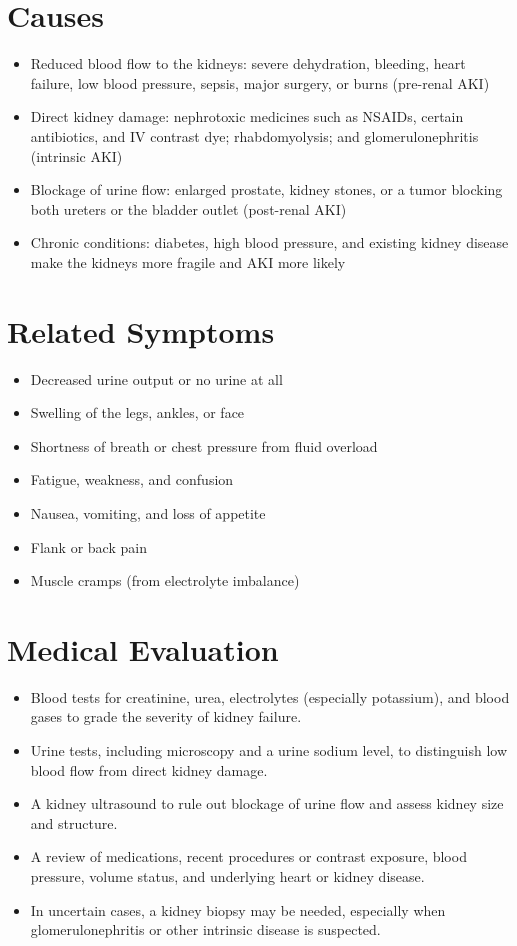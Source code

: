 \section*{Causes}
\begin{itemize}
  \item Reduced blood flow to the kidneys: severe dehydration, bleeding, heart failure, low blood pressure, sepsis, major surgery, or burns (pre-renal AKI)
  \item Direct kidney damage: nephrotoxic medicines such as NSAIDs, certain antibiotics, and IV contrast dye; rhabdomyolysis; and glomerulonephritis (intrinsic AKI)
  \item Blockage of urine flow: enlarged prostate, kidney stones, or a tumor blocking both ureters or the bladder outlet (post-renal AKI)
  \item Chronic conditions: diabetes, high blood pressure, and existing kidney disease make the kidneys more fragile and AKI more likely
\end{itemize}

\section*{Related Symptoms}
\begin{itemize}
  \item Decreased urine output or no urine at all
  \item Swelling of the legs, ankles, or face
  \item Shortness of breath or chest pressure from fluid overload
  \item Fatigue, weakness, and confusion
  \item Nausea, vomiting, and loss of appetite
  \item Flank or back pain
  \item Muscle cramps (from electrolyte imbalance)
\end{itemize}

\section*{Medical Evaluation}
\begin{itemize}
  \item Blood tests for creatinine, urea, electrolytes (especially potassium), and blood gases to grade the severity of kidney failure.
  \item Urine tests, including microscopy and a urine sodium level, to distinguish low blood flow from direct kidney damage.
  \item A kidney ultrasound to rule out blockage of urine flow and assess kidney size and structure.
  \item A review of medications, recent procedures or contrast exposure, blood pressure, volume status, and underlying heart or kidney disease.
  \item In uncertain cases, a kidney biopsy may be needed, especially when glomerulonephritis or other intrinsic disease is suspected.
\end{itemize}

